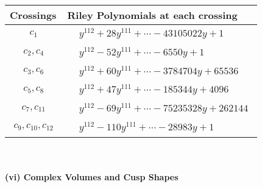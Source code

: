 \documentclass[1p]{elsarticle_modified}
\theoremstyle{definition}
\begin{document}
\begin{tabular}{m{50pt}|m{274pt}}
Crossings & \hspace{64pt}Riley Polynomials at each crossing \\
\hline $$\begin{aligned}c_{1}\end{aligned}$$&$\begin{aligned}
&y^{112}+28 y^{111}+\cdots-43105022 y+1
\end{aligned}$\\
\hline $$\begin{aligned}c_{2},c_{4}\end{aligned}$$&$\begin{aligned}
&y^{112}-52 y^{111}+\cdots-6550 y+1
\end{aligned}$\\
\hline $$\begin{aligned}c_{3},c_{6}\end{aligned}$$&$\begin{aligned}
&y^{112}+60 y^{111}+\cdots-3784704 y+65536
\end{aligned}$\\
\hline $$\begin{aligned}c_{5},c_{8}\end{aligned}$$&$\begin{aligned}
&y^{112}+47 y^{111}+\cdots-185344 y+4096
\end{aligned}$\\
\hline $$\begin{aligned}c_{7},c_{11}\end{aligned}$$&$\begin{aligned}
&y^{112}-69 y^{111}+\cdots-75235328 y+262144
\end{aligned}$\\
\hline $$\begin{aligned}c_{9},c_{10},c_{12}\end{aligned}$$&$\begin{aligned}
&y^{112}-110 y^{111}+\cdots-28983 y+1
\end{aligned}$\\
\hline
\end{tabular}\\~\\
\newpage\flushleft \textbf{(vi) Complex Volumes and Cusp Shapes}
\end{document}
